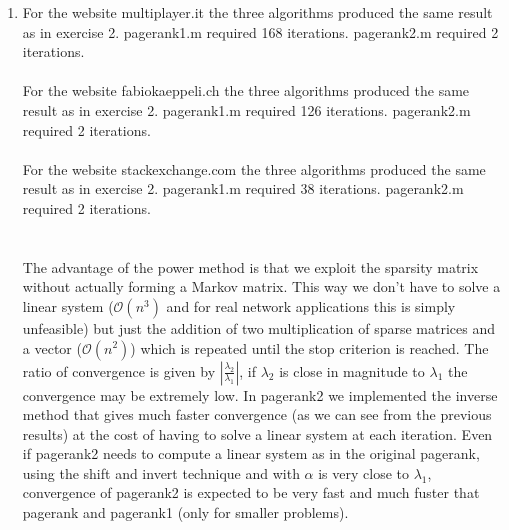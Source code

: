 \documentclass[unicode,11pt,a4paper,oneside,numbers=endperiod,openany]{scrartcl}
\begin{document}
\begin{enumerate}
    \item For the website multiplayer.it the three algorithms produced the same result as in exercise 2. pagerank1.m required 168 iterations. pagerank2.m required 2 iterations.\\ \\
    For the website fabiokaeppeli.ch the three algorithms produced the same result as in exercise 2. pagerank1.m required 126 iterations. pagerank2.m required 2 iterations.\\ \\
    For the website stackexchange.com the three algorithms produced the same result as in exercise 2. pagerank1.m required 38 iterations. pagerank2.m required 2 iterations.\\\\\\
    The advantage of the power method is that we exploit the sparsity matrix without actually forming a Markov matrix. This way we don’t have to solve a linear system ($\mathcal{O}(n^3)$ and for real network applications this is simply unfeasible) but just the addition of two multiplication of sparse matrices and a vector ($\mathcal{O}(n^2)$) which is  repeated until the stop criterion is reached. The ratio of convergence is given by $|\frac{\lambda_2}{\lambda_1}|$, if $\lambda_2$ is close in magnitude to $\lambda_1$ the convergence may be extremely low. In pagerank2 we implemented the inverse method that gives much faster convergence (as we can see from the previous results) at the cost of having to solve a linear system at each iteration. Even if pagerank2 needs to compute a linear system as in the original pagerank, using the shift and invert technique and with $\alpha$ is very close to $\lambda_1$, convergence of pagerank2 is expected to be very fast and much fuster that pagerank and pagerank1 (only for smaller problems).
    
    
    
    
    
\end{enumerate}
\end{document}
